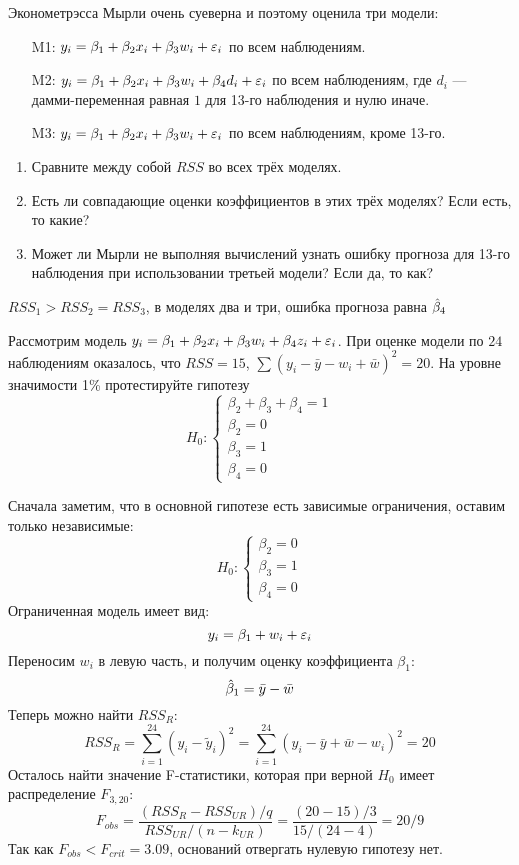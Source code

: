 \begin{problem} %
Эконометрэсса Мырли очень суеверна и поэтому оценила три модели:
\begin{enumerate}
\item[M1:] $y_i=\beta_1 + \beta_2 x_i + \beta_3 w_i + \varepsilon_i$ по всем наблюдениям.
\item[M2:] $y_i=\beta_1 + \beta_2 x_i + \beta_3 w_i + \beta_4 d_i + \varepsilon_i$ по всем наблюдениям, где $d_i$ — дамми-переменная равная $1$ для 13-го наблюдения и нулю иначе.
\item[M3:] $y_i=\beta_1 + \beta_2 x_i + \beta_3 w_i + \varepsilon_i$ по всем наблюдениям, кроме 13-го.
\end{enumerate}

\begin{enumerate}
\item Сравните между собой $RSS$ во всех трёх моделях.
\item Есть ли совпадающие оценки коэффициентов в этих трёх моделях? Если есть, то какие?
\item Может ли Мырли не выполняя вычислений узнать ошибку прогноза для 13-го наблюдения при использовании третьей модели? Если да, то как?
\end{enumerate}


\begin{sol}
$RSS_1 > RSS_2 = RSS_3$, в моделях два и три, ошибка прогноза равна $\hat{\beta}_4$
\end{sol}
\end{problem}


\begin{problem} %
Рассмотрим модель $y_i = \beta_1+ \beta_2 x_i + \beta_3 w_i +\beta_4 z_i + \varepsilon_i$.  При оценке модели по $24$ наблюдениям оказалось, что $RSS=15$, $\sum (y_i-\bar{y}-w_i+\bar{w})^2=20$. На уровне значимости 1\% протестируйте гипотезу
\[
H_0:
\begin{cases}
\beta_2+\beta_3+\beta_4=1 \\
\beta_2=0 \\
\beta_3=1 \\
\beta_4=0
\end{cases}
\]


\begin{sol}
Сначала заметим, что в основной гипотезе есть зависимые ограничения, оставим только независимые:
\[
H_0:
\begin{cases}
\beta_2=0 \\
\beta_3=1 \\
\beta_4=0
\end{cases}
\]
Ограниченная модель имеет вид:
\[
y_i = \beta_1 + w_i + \varepsilon_i
\]
Переносим $w_i$ в левую часть, и получим оценку коэффициента $\beta_1$:
\[
\hat{\beta}_1  = \bar y - \bar w
\]
Теперь можно найти $RSS_R$:
\[
RSS_R = \sum_{i=1}^{24} (y_i - \hat{\tilde{y}}_i)^2 = \sum_{i=1}^{24} (y_i - \bar y + \bar w - w_i)^2 = 20
\]
Осталось найти значение F-статистики, которая при верной $H_0$ имеет распределение $F_{3, 20}$:
\[
F_{obs} = \frac{(RSS_R - RSS_{UR})/q}{RSS_{UR}/(n-k_{UR})} = \frac{(20-15)/3}{15/(24-4)} = 20/9
\]
Так как $F_{obs} < F_{crit} = 3.09$, оснований отвергать нулевую гипотезу нет.
\end{sol}
\end{problem}




